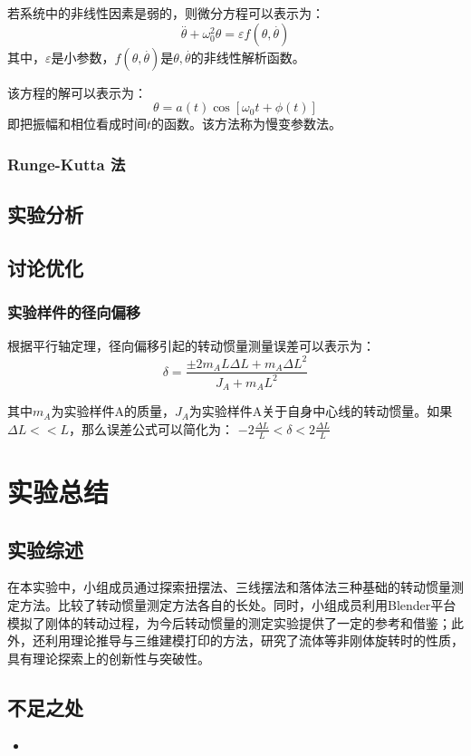 \documentclass[12pt,hyperref,a4paper,UTF8]{ctexart}
\begin{document}
\begin{itemize}
若系统中的非线性因素是弱的，则微分方程可以表示为：
$$ \overset{..}\theta+\omega_0^2\theta=\varepsilon f(\theta,\overset{.}\theta) $$
其中，$\varepsilon$是小参数，$f(\theta,\overset{.}\theta)$是$\theta,\overset{.}\theta$的非线性解析函数。

该方程的解可以表示为：
$$ \theta=a(t)\cos[\omega_0t+\phi(t)] $$
即把振幅和相位看成时间$t$的函数。该方法称为慢变参数法。
\subsubsection{Runge-Kutta 法}


\subsection{实验分析}


\subsection{讨论优化}
\subsubsection{实验样件的径向偏移}
根据平行轴定理，径向偏移引起的转动惯量测量误差可以表示为：
$$ \delta=\frac{\pm 2m_AL\Delta L+m_A\Delta L^2}{J_A+m_AL^2} $$

其中$m_A$为实验样件A的质量，$J_A$为实验样件A关于自身中心线的转动惯量。如果$\Delta L<<L$，那么误差公式可以简化为：
$ -2\frac{\Delta L}{L}<\delta<2\frac{\Delta L}{L} $
\section{实验总结}
\subsection{实验综述}
在本实验中，小组成员通过探索扭摆法、三线摆法和落体法三种基础的转动惯量测定方法。比较了转动惯量测定方法各自的长处。同时，小组成员利用Blender平台模拟了刚体的转动过程，为今后转动惯量的测定实验提供了一定的参考和借鉴；此外，还利用理论推导与三维建模打印的方法，研究了流体等非刚体旋转时的性质，具有理论探索上的创新性与突破性。
\subsection{不足之处}
    \begin{itemize}
        \item \textbf{}
    \end{itemize}

\end{itemize}
\end{document}
